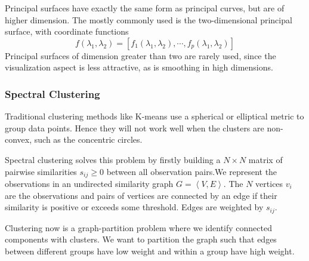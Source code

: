 Principal surfaces have exactly the same form as principal curves, but are of higher dimension. The mostly commonly used is the two-dimensional principal surface, with coordinate functions
\begin{equation}
f(\lambda_1, \lambda_2) = \left[ f_1(\lambda_1, \lambda_2), \cdots, f_p(\lambda_1, \lambda_2)\right]
\end{equation}
Principal surfaces of dimension greater than two are rarely used, since the visualization aspect is less attractive, as is smoothing in high dimensions.

\subsubsection{Spectral Clustering}
Traditional clustering methods like K-means use a spherical or elliptical metric to group data points. Hence they will not work well when the clusters are non-convex, such as the concentric circles.

Spectral clustering solves this problem by firstly building a $N\times N$ matrix of pairwise similarities $s_{ij}\ge 0$ between all observation pairs.We represent the observations in an undirected similarity graph $G = \left\langle V, E\right\rangle$. The $N$ vertices $v_i$ are the observations and pairs of vertices are connected by an edge if their similarity is positive or exceeds some threshold. Edges are weighted by $s_{ij}$.

Clustering now is a graph-partition problem where we identify connected components with clusters. We  want to partition the graph such that edges between different groups have low weight and within a group have high weight.

